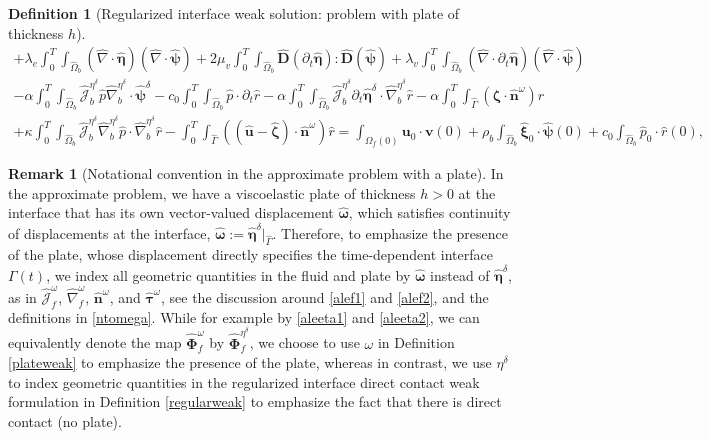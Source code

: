 \documentclass[11pt]{article}
\newcommand{\bd}{\boldsymbol}
\theoremstyle{definition}
\newtheorem{definition}{Definition}[section]
\newtheorem{remark}{Remark}[section]
\begin{document}
\begin{definition}[Regularized interface weak solution: problem with plate of thickness $h$]
\begin{multline*}
+ \lambda_{e} \int_{0}^{T} \int_{\hat{\Omega}_{b}} (\hat{\nabla} \cdot \hat{\bd{\eta}}) (\hat{\nabla} \cdot \hat{\bd{\psi}}) + 2\mu_{v} \int_{0}^{T} \int_{\hat{\Omega}_{b}} \hat{\bd{D}}(\partial_{t}\hat{\bd{\eta}}) : \hat{\bd{D}}(\hat{\bd{\psi}}) + \lambda_{v} \int_{0}^{T} \int_{\hat{\Omega}_{b}} (\hat{\nabla} \cdot \partial_{t} \hat{\bd{\eta}}) (\hat{\nabla} \cdot \hat{\bd{\psi}}) \\
- \alpha \int_{0}^{T} \int_{\hat{\Omega}_{b}} \hat{\mathcal{J}}^{\eta^{\delta}}_{b} \hat{p} \hat{\nabla}^{\eta^{\delta}}_{b} \cdot \hat{\bd{\psi}}^{\delta} - c_{0} \int_{0}^{T} \int_{\hat{\Omega}_{b}} \hat{p} \cdot \partial_{t} \hat{r} - \alpha \int_{0}^{T} \int_{\hat{\Omega}_{b}} \hat{\mathcal{J}}^{\eta^{\delta}}_{b} \partial_{t} \hat{\bd{\eta}}^{\delta} \cdot \hat{\nabla}^{\eta^{\delta}}_{b} \hat{r} - \alpha \int_{0}^{T} \int_{\hat{\Gamma}} (\bd{\zeta} \cdot \hat{\bd{n}}^{\omega}) \hat{r} \\
+ \kappa \int_{0}^{T} \int_{\hat{\Omega}_{b}} \hat{\mathcal{J}}^{\eta^{\delta}}_{b} \hat{\nabla}^{\eta^{\delta}}_{b} \hat{p} \cdot \hat{\nabla}^{\eta^{\delta}}_{b} \hat{r} - \int_{0}^{T} \int_{\hat{\Gamma}} ((\hat{\bd{u}} - \hat{\bd{\zeta}}) \cdot \hat{\bd{n}}^{\omega}) \hat{r} = \int_{\Omega_{f}(0)} \bd{u}_0 \cdot \bd{v}(0) + \rho_{b} \int_{\hat{\Omega}_{b}} \hat{\bd{\xi}}_{0} \cdot \hat{\bd{\psi}}(0) + c_{0} \int_{\hat{\Omega}_{b}} \hat{p}_0 \cdot \hat{r}(0),
\end{multline*}
\end{definition}

\begin{remark}[Notational convention in the approximate problem with a plate]
In the approximate problem, we have a viscoelastic plate of thickness $h > 0$ at the interface that has its own vector-valued displacement $\hat{\bd{\omega}}$, which satisfies continuity of displacements at the interface, $\hat{\bd{\omega}} := \hat{\bd{\eta}}^{\delta}|_{\hat{\Gamma}}$. Therefore, to emphasize the presence of the plate, whose displacement directly specifies the time-dependent interface $\Gamma(t)$, we index all geometric quantities in the fluid and plate by $\hat{\bd{\omega}}$ instead of $\hat{\bd{\eta}}^{\delta}$, as in $\hat{\mathcal{J}}^{\omega}_{f}$, $\hat{\nabla}^{\omega}_{f}$, $\hat{\bd{n}}^{\omega}$, and $\hat{\bd{\tau}}^{\omega}$, see the discussion around \eqref{alef1} and \eqref{alef2}, and the definitions in \eqref{ntomega}. While for example by \eqref{aleeta1} and \eqref{aleeta2}, we can equivalently denote the map $\hat{\bd{\Phi}}^{\omega}_{f}$ by $\hat{\bd{\Phi}}^{\eta^{\delta}}_{f}$, we choose to use $\omega$ in Definition \ref{plateweak} to emphasize the presence of the plate, whereas in contrast, we use $\eta^{\delta}$ to index geometric quantities in the regularized interface direct contact weak formulation in Definition \ref{regularweak} to emphasize the fact that there is direct contact (no plate).
\end{remark}
\end{document}
